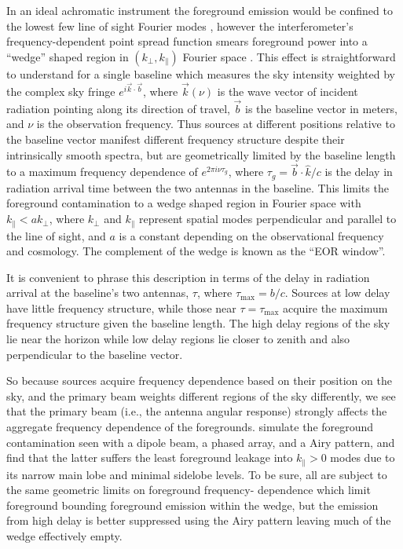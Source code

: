 \documentclass{emulateapj}
\begin{document}
In an ideal achromatic instrument the foreground emission would be confined to the lowest few 
line of sight Fourier modes \citep[e.g.,][]{MoralesBowmanHewittFGsub}, however  the  
interferometer's frequency-dependent point spread function smears foreground power into a ``wedge'' shaped 
region in  $(k_\perp,k_\parallel)$ Fourier space \citep{Dattapowerspec,X13, PoberWedge,MoralesPSShapes, VedanthamWedge, nithya13, CathWedge, AdrianWedge1, AdrianWedge2,parsons12b}. This effect is straightforward to understand for a single baseline which measures the sky intensity weighted by the complex sky fringe 
$e^{i \vec{k}\cdot\vec{b}}$, where $\vec{k}(\nu)$ is the wave vector of incident radiation pointing along its direction of travel, $\vec{b}$ is the baseline vector in meters, and $\nu$ is the observation frequency. Thus sources at different positions relative to the baseline vector manifest different 
frequency structure despite their intrinsically smooth spectra, but are geometrically limited 
by the baseline length to a maximum frequency dependence of  $e^{2\pi i \nu \tau_g}$, where $\tau_g=\vec{b}\cdot\hat{k}/c$ is the delay in radiation arrival time between the two antennas in the baseline. This limits the foreground contamination 
to a wedge shaped region in Fourier space with $k_\parallel<a k_\perp$, where $k_\perp$ and $k_\parallel$ represent spatial modes 
perpendicular and parallel to the line of sight, and $a$ is a constant depending on the observational frequency and cosmology. The complement of the wedge is known as the ``EOR window''.

It is convenient to phrase this description in terms 
of the delay in radiation arrival at the baseline's two antennas, $\tau$, where $\tau_
\text{max}=b/c$. Sources at low delay have little frequency 
structure, while those near $\tau=\tau_\text{max}$ acquire the maximum frequency 
structure given the baseline length. The high delay regions of the sky lie near the horizon while low delay 
regions lie closer to zenith and also perpendicular to the baseline vector.

So because sources acquire frequency dependence based on their position on the sky, and the primary beam weights different regions of the sky differently, we see that the primary beam (i.e., the antenna angular response) strongly affects the aggregate frequency dependence 
of the foregrounds. \citet{nithya15} simulate the foreground contamination seen with a dipole beam, a phased array, and a Airy pattern,
and find that the latter suffers the least foreground leakage into
 $k_\parallel>0$ modes due to its narrow main lobe and minimal sidelobe 
levels. To be sure, all are subject to the same geometric limits on foreground frequency-
dependence which limit foreground bounding foreground emission within the wedge, but the emission from high delay is better suppressed using the 
Airy pattern leaving much of the wedge effectively empty. 
\end{document}

